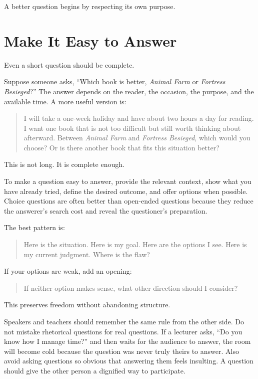 A better question begins by respecting its own purpose.

\section*{Make It Easy to Answer}

Even a short question should be complete.

Suppose someone asks, ``Which book is better, \emph{Animal Farm} or \emph{Fortress Besieged}?'' The answer depends on the reader, the occasion, the purpose, and the available time. A more useful version is:

\begin{quote}
I will take a one-week holiday and have about two hours a day for reading. I want one book that is not too difficult but still worth thinking about afterward. Between \emph{Animal Farm} and \emph{Fortress Besieged}, which would you choose? Or is there another book that fits this situation better?
\end{quote}

This is not long. It is complete enough.

To make a question easy to answer, provide the relevant context, show what you have already tried, define the desired outcome, and offer options when possible. Choice questions are often better than open-ended questions because they reduce the answerer's search cost and reveal the questioner's preparation.

The best pattern is:

\begin{quote}
Here is the situation. Here is my goal. Here are the options I see. Here is my current judgment. Where is the flaw?
\end{quote}

If your options are weak, add an opening:

\begin{quote}
If neither option makes sense, what other direction should I consider?
\end{quote}

This preserves freedom without abandoning structure.

Speakers and teachers should remember the same rule from the other side. Do not mistake rhetorical questions for real questions. If a lecturer asks, ``Do you know how I manage time?'' and then waits for the audience to answer, the room will become cold because the question was never truly theirs to answer. Also avoid asking questions so obvious that answering them feels insulting. A question should give the other person a dignified way to participate.

